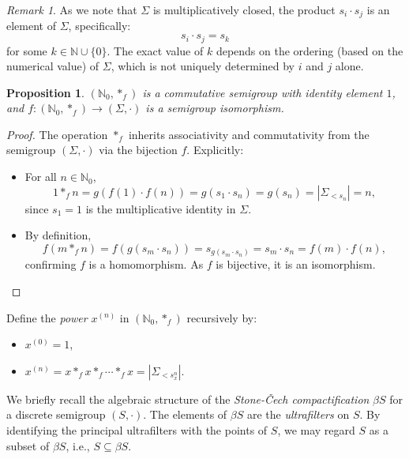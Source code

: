 \documentclass[12pt]{amsart}
\theoremstyle{plain}
\newtheorem{prop}[theorem]{Proposition}
\theoremstyle{definition}
\theoremstyle{remark}
\newtheorem{remark}[theorem]{Remark}
\numberwithin{equation}{section}
\begin{document}
\begin{remark}

As we note that $\Sigma$ is multiplicatively closed, the product \( s_i \cdot s_j \) is an element of \( \Sigma \), specifically:
\[
s_i \cdot s_j = s_k
\]
for some \( k \in \mathbb{N} \cup \{0\} \). The exact value of \( k \) depends on the ordering (based on the numerical value) of \( \Sigma \), which is not uniquely determined by \( i \) and \( j \) alone.
\end{remark}
\begin{prop}
\((\mathbb{N}_0, \ast_f)\) is a commutative semigroup with identity element \(1\), and \(f: (\mathbb{N}_0, \ast_f) \to (\Sigma, \cdot)\) is a semigroup isomorphism.
\end{prop}

\begin{proof}
The operation \(\ast_f\) inherits associativity and commutativity from the semigroup \((\Sigma, \cdot)\) via the bijection \(f\). Explicitly:
\begin{itemize}
\item  For all \(n \in \mathbb{N}_0\),
\[
1 \ast_f n = g(f(1) \cdot f(n)) = g(s_1 \cdot s_n) = g(s_n) = \left|\Sigma_{<s_n}\right| = n,
\]
since \(s_1 = 1\) is the multiplicative identity in \(\Sigma\).

\item  By definition, 
\[
f(m \ast_f n) = f(g(s_m \cdot s_n)) = s_{g(s_m \cdot s_n)} = s_m \cdot s_n = f(m) \cdot f(n),
\]
confirming \(f\) is a homomorphism. As \(f\) is bijective, it is an isomorphism.
\end{itemize}
\end{proof}

\noindent Define the \emph{power} \(x^{(n)}\) in \((\mathbb{N}_0, \ast_f)\) recursively by:
\begin{itemize}
\item \(x^{(0)} = 1\),
\item \(x^{(n)} = x \ast_f x \ast_f \cdots \ast_f x = \left|\Sigma_{<s_x^n}\right|\).
\end{itemize}

We briefly recall the algebraic structure of the \emph{Stone-Čech compactification} \(\beta S\) for a discrete semigroup \((S, \cdot)\). The elements of \(\beta S\) are the \emph{ultrafilters} on \(S\). By identifying the principal ultrafilters with the points of \(S\), we may regard \(S\) as a subset of \(\beta S\), i.e., \(S \subseteq \beta S\). 
\end{document}
